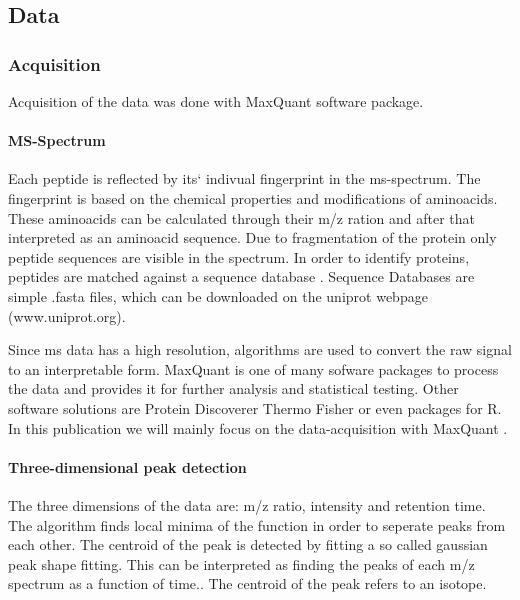 \documentclass[
]{article}
\begin{document}
\hypertarget{data}{%
\subsection{Data}\label{data}}

\hypertarget{acquisition}{%
\subsubsection{Acquisition}\label{acquisition}}

Acquisition of the data was done with MaxQuant \citep{Cox2008} software
package.

\hypertarget{ms-spectrum}{%
\paragraph{MS-Spectrum}\label{ms-spectrum}}

Each peptide is reflected by its` indivual fingerprint in the
ms-spectrum. The fingerprint is based on the chemical properties and
modifications of aminoacids. These aminoacids can be calculated through
their m/z ration and after that interpreted as an aminoacid sequence.
Due to fragmentation of the protein only peptide sequences are visible
in the spectrum. In order to identify proteins, peptides are matched
against a sequence database \citep{Cox2008}. Sequence Databases are
simple .fasta files, which can be downloaded on the uniprot webpage
(www.uniprot.org).

Since ms data has a high resolution, algorithms are used to convert the
raw signal to an interpretable form. MaxQuant is one of many sofware
packages to process the data and provides it for further analysis and
statistical testing. Other software solutions are Protein Discoverer
Thermo Fisher or even packages for R. In this publication we will mainly
focus on the data-acquisition with MaxQuant \citep{Cox2008}.

\hypertarget{three-dimensional-peak-detection}{%
\paragraph{Three-dimensional peak
detection}\label{three-dimensional-peak-detection}}

The three dimensions of the data are: m/z ratio, intensity and retention
time. The algorithm finds local minima of the function in order to
seperate peaks from each other. The centroid of the peak is detected by
fitting a so called gaussian peak shape fitting. This can be interpreted
as finding the peaks of each m/z spectrum as a function of time.. The
centroid of the peak refers to an isotope.
\end{document}

